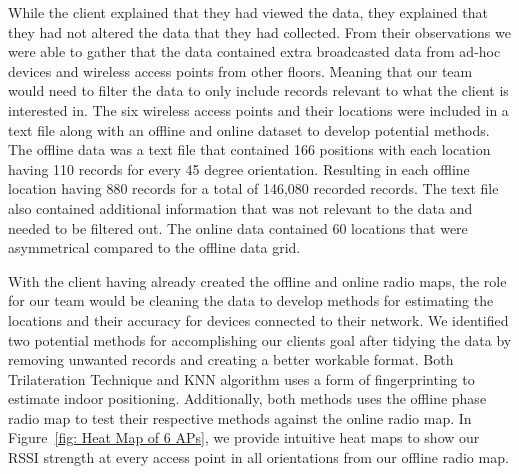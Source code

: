 \documentclass[12pt, conference]{IEEEtran}
\begin{document}
While the client explained that they had viewed the data, they explained that they had not altered the data that they had collected. From their observations we were able to gather that the data contained extra broadcasted data from ad-hoc devices and wireless access points from other floors. Meaning that our team would need to filter the data to only include records relevant to what the client is interested in. The six wireless access points and their locations were included in a text file along with an offline and online dataset to develop potential methods. The offline data was a text file that contained 166 positions with each location having 110 records for every 45 degree orientation. Resulting in each offline location having 880 records for a total of 146,080 recorded records. The text file also contained additional information that was not relevant to the data and needed to be filtered out. The online data contained 60 locations that were asymmetrical compared to the offline data grid. 

With the client having already created the offline and online radio maps, the role for our team would be cleaning the data to develop methods for estimating the locations and their accuracy for devices connected to their network. We identified two potential methods for accomplishing our clients goal after tidying the data by removing unwanted records and creating a better workable format. Both Trilateration Technique and KNN algorithm uses a form of fingerprinting to estimate indoor positioning. Additionally, both methods uses the offline phase radio map to test their respective methods against the online radio map. In Figure~\ref{fig: Heat Map of 6 APs}, we provide intuitive heat maps to show our RSSI strength at every access point in all orientations from our offline radio map.
\end{document}
